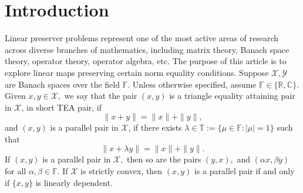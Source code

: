 \documentclass{amsart}
\theoremstyle{definition}
\theoremstyle{remark}
\numberwithin{equation}{section}
\begin{document}
\section{Introduction}
Linear preserver problems represent one of the most active areas of research across diverse branches of mathematics, including matrix theory, Banach space theory, operator theory, operator algebra, etc. The purpose of this article is to explore linear maps preserving certain norm equality conditions. 
Suppose $\mathcal{X},\mathcal{Y}$ are  Banach spaces over the field $\mathbb{F}.$ Unless otherwise specified, assume $\mathbb{F}\in\{\mathbb{R}, \mathbb{C}\}.$ Given $x,y\in \mathcal{X},$ we say that the pair $(x,y)$ is a triangle equality attaining pair in $\mathcal{X}$, in short TEA pair, if  %
$$\|x+y\|=\|x\|+\|y\|,$$
and  $(x,y)$ is a parallel pair in $\mathcal{X}$, if there exists $\lambda\in \mathbb{T}:=\{\mu\in \mathbb{F}:|\mu|=1\}$ such that 
 $$\|x+\lambda y\|=\|x\|+\|y\|.$$
 If $(x,y)$ is a parallel pair in $\mathcal{X},$ then so are the pairs $(y,x),$ and $(\alpha x,\beta y)$ for all $\alpha,\beta\in \mathbb{F}.$ If $\mathcal{X}$ is strictly convex, then $(x,y)$ is a parallel pair if and only if $\{x,y\}$ is linearly dependent. \\
 
\end{document}
